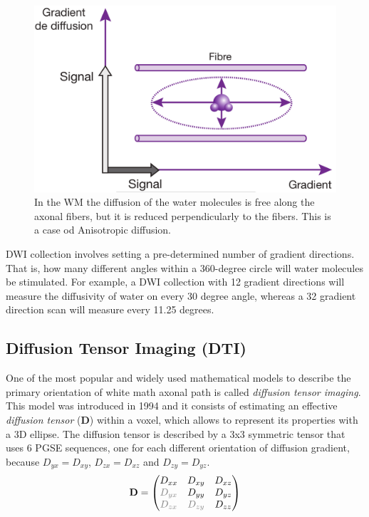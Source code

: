  \begin{figure}[h]
    \centering
    \begin{minipage}[c]{0.4\textwidth}
      \includegraphics[width=\textwidth]{images/anisotropi.png}
    \end{minipage}\hfill
    \begin{minipage}[b]{0.5\textwidth}
      \caption{In the WM the diffusion of the water molecules is free along the axonal fibers, but it is reduced perpendicularly to the fibers. This is a case od Anisotropic diffusion. \cite{KastlerVetterIRM}}
      \label{fig:isotropiAnisotropi}
    \end{minipage}
 \end{figure}

 DWI collection involves setting a pre-determined number of gradient directions. That is, how many different angles within a 360-degree circle will water molecules be stimulated. For example, a DWI collection with 12 gradient directions will measure the diffusivity of water on every 30 degree angle, whereas a 32 gradient direction scan will measure every 11.25 degrees. \cite{de2011basic}

 \subsection{Diffusion Tensor Imaging (DTI)}
 One of the most popular and widely used mathematical models to describe the primary orientation of white math axonal path is called \emph{diffusion tensor imaging}. This model was introduced in 1994 \cite{basser1994mr} and it consists of estimating an effective \emph{diffusion tensor} ($\mathbf{D}$) within a voxel, which allows to represent its properties with a 3D ellipse. The diffusion tensor is described by a 3x3 symmetric tensor that uses 6 PGSE sequences, one for each different orientation of diffusion gradient, because $D_{yx}=D_{xy}$, $D_{zx}=D_{xz}$ and $D_{zy}=D_{yz}$.
 \begin{equation}
    \mathbf{D} = 
    \begin{pmatrix}
        D_{xx} & D_{xy} & D_{xz} \\
        \textcolor{gray}{D_{yx}} & D_{yy} & D_{yz} \\
        \textcolor{gray}{D_{zx}} & \textcolor{gray}{D_{zy}} & D_{zz}
    \end{pmatrix}
 \end{equation}

